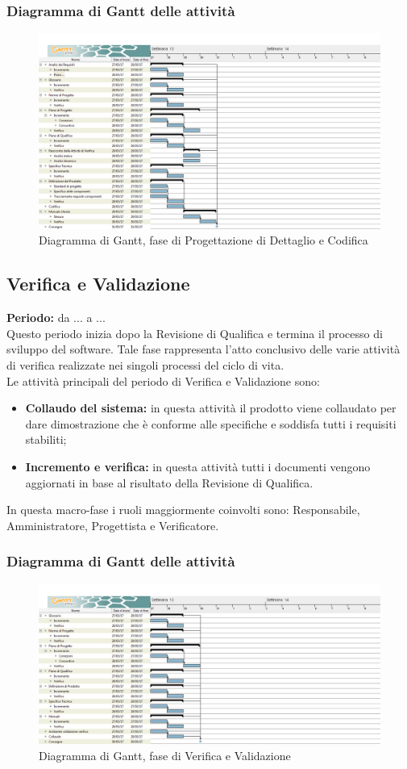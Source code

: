 	\subsubsection{Diagramma di Gantt delle attività}
	\begin{figure}[H]
		\centering
		\includegraphics[width=1\linewidth]{immagini/gantt/progettazione_dettaglio_codifica.png}
		\caption{Diagramma di Gantt, fase di Progettazione di Dettaglio e Codifica}
	\end{figure}
	\subsection{Verifica e Validazione}
	\textbf{Periodo:} da ... a ... \\
	Questo periodo inizia dopo la Revisione di Qualifica e termina il processo di sviluppo del software. Tale fase rappresenta l'atto conclusivo delle varie attività di verifica realizzate nei singoli processi del ciclo di vita. \\
	Le attività principali del periodo di Verifica e Validazione sono: \\
	\begin{itemize}
		\item \textbf{Collaudo del sistema:} in questa attività il prodotto viene collaudato per dare
dimostrazione che è conforme alle specifiche e soddisfa tutti i requisiti stabiliti; \\
		\item \textbf{Incremento e verifica:} in questa attività tutti i documenti vengono aggiornati in base al risultato della Revisione di Qualifica. \\
	\end{itemize}
	In questa macro-fase i ruoli maggiormente coinvolti sono: Responsabile, Amministratore, Progettista e Verificatore.
	\subsubsection{Diagramma di Gantt delle attività}
	\begin{figure}[H]
		\centering
		\includegraphics[width=1\linewidth]{immagini/gantt/validazione.png}
		\caption{Diagramma di Gantt, fase di Verifica e Validazione}
	\end{figure}